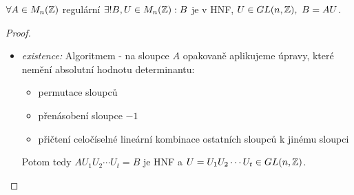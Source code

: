 \begin{theorem}
    $\forall A \in M_n(\operatorname{\mathbb{Z}})$ regulární $\exists ! B,U\in M_{n}(\operatorname{\mathbb{Z}}): B$ je v HNF, $U \in GL(n,\operatorname{\mathbb{Z}}),\ B = AU$.
\end{theorem}
\begin{proof}
\phantom{}
\begin{itemize}[label={}]
    \item \emph{existence:}
    Algoritmem - na sloupce $A$ opakovaně aplikujeme úpravy, které nemění absolutní hodnotu determinantu:
    \begin{itemize}
        \item permutace sloupců
        \item přenásobení sloupce $-1$
        \item přičtení celočíselné lineární kombinace ostatních sloupců k jinému sloupci
    \end{itemize}
    Potom tedy $AU_1U_2\cdots U_t = B$ je HNF a $U = U_1U_2 \cdots U_t \in GL(n,\operatorname{\mathbb{Z}})$.


\end{itemize}
\end{proof}

